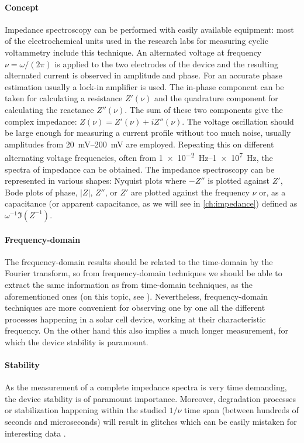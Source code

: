 	\paragraph{Concept}
	Impedance spectroscopy can be performed with easily available equipment: most of the electrochemical units used in the research labs for measuring cyclic voltammetry include this technique.
	An alternated voltage at frequency $\nu = \omega / (2 \pi)$ is applied to the two electrodes of the device and the resulting alternated current is observed in amplitude and phase.
	For an accurate phase estimation usually a lock-in amplifier is used.
	The in-phase component can be taken for calculating a resistance $Z'(\nu)$ and the quadrature component for calculating the reactance $Z''(\nu)$.
	The sum of these two components give the complex impedance: $Z(\nu) = Z'(\nu) + iZ''(\nu)$.
	The voltage oscillation should be large enough for measuring a current profile without too much noise, usually amplitudes from \SIrange{20}{200}{\mV} are employed.
	Repeating this on different alternating voltage frequencies, often from \SIrange{1e-2}{1e7}{\Hz}, the spectra of impedance can be obtained.
	The impedance spectroscopy can be represented in various shapes: Nyquist plots where $-Z''$ is plotted against $Z'$, Bode plots of phase, $|Z|$, $Z''$, or $Z'$ are plotted against the frequency $\nu$ or, as a capacitance (or apparent capacitance, as we will see in \cref{ch:impedance}) defined as $\omega^{-1}\Im(Z^{-1})$.

	\paragraph{Frequency\hyp{}domain}
The frequency\hyp{}domain results should be related to the time\hyp{}domain by the Fourier transform, so from frequency\hyp{}domain techniques we should be able to extract the same information as from time\hyp{}domain techniques, as the aforementioned ones (on this topic, see ).
Nevertheless, frequency\hyp{}domain techniques are more convenient for observing one by one all the different processes happening in a solar cell device, working at their characteristic frequency.
On the other hand this also implies a much longer measurement, for which the device stability is paramount.

	\paragraph{Stability}
	As the measurement of a complete impedance spectra is very time demanding, the device stability is of paramount importance.
	Moreover, degradation processes or stabilization happening within the studied $1/\nu$ time span (between hundreds of seconds and microseconds) will result in glitches which can be easily mistaken for interesting data \cite{Jacobs2018,Moia2019}.

